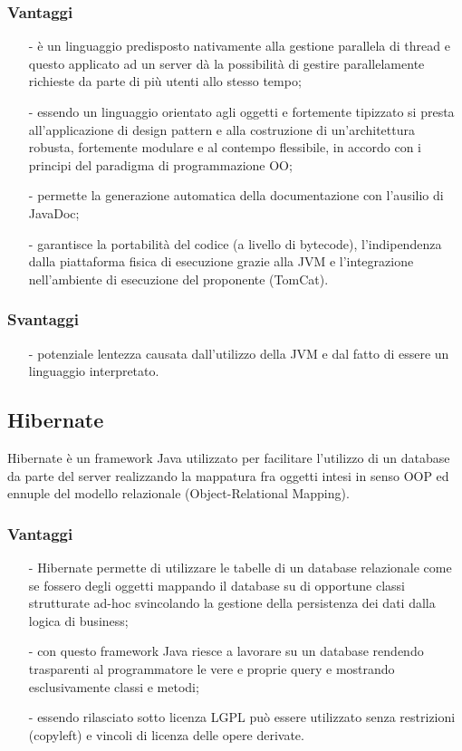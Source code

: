\subsubsection*{Vantaggi}
\begin{itemize}
\item[-] è un linguaggio predisposto nativamente alla gestione parallela di thread e questo applicato ad un server dà la possibilità di gestire parallelamente richieste da parte di più utenti allo stesso tempo;
\item[-] essendo un linguaggio orientato agli oggetti e fortemente tipizzato si presta all'applicazione di design pattern e alla costruzione di un'architettura robusta, fortemente modulare e al contempo flessibile, in accordo con i principi del paradigma di programmazione OO;
\item[-] permette la generazione automatica della documentazione con l'ausilio di JavaDoc;
\item[-] garantisce la portabilità del codice (a livello di bytecode), l'indipendenza dalla piattaforma fisica di esecuzione grazie alla JVM e l'integrazione nell'ambiente di esecuzione del proponente (TomCat).
\end{itemize}
\subsubsection*{Svantaggi}
\begin{itemize}
\item[-] potenziale lentezza causata dall'utilizzo della JVM e dal fatto di essere un linguaggio interpretato.
\end{itemize}

\subsection{Hibernate}
Hibernate è un framework Java utilizzato per facilitare l'utilizzo di un database da parte del server realizzando la mappatura fra oggetti intesi in senso OOP ed ennuple del modello relazionale (Object-Relational Mapping).

\subsubsection*{Vantaggi}
\begin{itemize}
\item[-] Hibernate permette di utilizzare le tabelle di un database relazionale come se fossero degli oggetti mappando il database su di opportune classi strutturate ad-hoc svincolando la gestione della persistenza dei dati dalla logica di business;
\item[-] con questo framework Java riesce a lavorare su un database rendendo trasparenti al programmatore le vere e proprie query e mostrando esclusivamente classi e metodi;
\item[-] essendo rilasciato sotto licenza LGPL può essere utilizzato senza restrizioni (copyleft) e vincoli di licenza delle opere derivate. 
\end{itemize}
\clearpage


